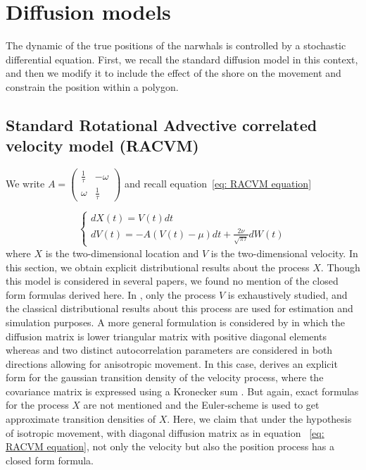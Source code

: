 \documentclass[11pt]{article}
\newcommand {\1}{\mathbb{1}}
\begin{document}
\section{Diffusion models}

The dynamic of the true positions of the narwhals is controlled by a stochastic differential equation. First, we recall the standard diffusion model in this context, and then we modify it to include the effect of the shore on the movement and constrain the position within a polygon.


\subsection{Standard Rotational Advective correlated velocity model (RACVM)}
\label{section: RACVM}


We write $A=\begin{pmatrix} 
	\frac{1}{\tau} & -\omega \\
	\omega & \frac{1}{\tau}
\end{pmatrix}$ and recall equation~\ref{eq: RACVM equation}

\begin{equation*} \left\{
	\begin{array}{l}
		dX(t)=V(t)dt \\
		dV(t)=-A(V(t)-\mu)dt+\frac{2\nu}{\sqrt{\pi \tau}} dW(t) 
	\end{array}
	\right.
	\label{eq: RACVM equation bis}
\end{equation*}
where $X$ is the two-dimensional location and $V$ is the two-dimensional velocity.
In this section, we obtain explicit distributional results about the process $X$. Though this model is considered in several papers, we found no mention of the closed form formulas derived here. In \cite{gurarie_correlated_2017}, only the process $V$ is exhaustively studied, and the classical distributional results about this process are used for estimation and simulation purposes.
A more general formulation is considered by \cite{albertsen_generalizing_2018} in which the diffusion matrix is lower triangular matrix with positive diagonal elements whereas and two distinct autocorrelation parameters are considered in both directions allowing for anisotropic movement.
In this case, \cite{albertsen_generalizing_2018} derives an explicit form for the gaussian transition density of the velocity process, where the covariance matrix is expressed using a Kronecker sum \cite{albertsen_generalizing_2018}. But again, exact formulas for the process $X$ are not mentioned and the Euler-scheme is used to get approximate transition densities of $X$. Here, we claim that under the hypothesis of isotropic movement, with diagonal diffusion matrix as in equation ~\ref{eq: RACVM equation}, not only the velocity but also the position process has a closed form formula. \\
\end{document}
